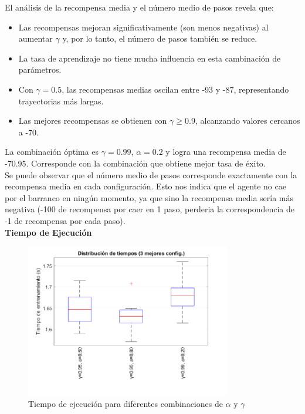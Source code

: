El análisis de la recompensa media y el número medio de pasos revela que:

\begin{itemize}
    \item Las recompensas mejoran significativamente (son menos negativas) al aumentar $\gamma$ y, por lo tanto, el número de pasos también se reduce. 
    \item La tasa de aprendizaje no tiene mucha influencia en esta cambinación de parámetros. 
    \item Con $\gamma = 0.5$, las recompensas medias oscilan entre -93 y -87, representando trayectorias más largas.
    \item Las mejores recompensas se obtienen con $\gamma \geq 0.9$, alcanzando valores cercanos a -70.
\end{itemize}

La combinación óptima es $\gamma = 0.99$, $\alpha = 0.2$ y logra una recompensa media de -70.95. Corresponde con la combinación que obtiene mejor tasa de éxito. 
\\

Se puede observar que el número medio de pasos corresponde exactamente con la recompensa media en cada configuración. Esto nos indica que el agente no cae por el barranco en ningún momento, ya que sino la recompensa media sería más negativa (-100 de recompensa por caer en 1 paso, perderia la correspondencia de -1 de recompensa por cada paso).
\\

\textbf{Tiempo de Ejecución}

\begin{figure}[H]
    \centering
    \includegraphics[width=0.8\textwidth]{../../experiments/qlearning/experiment-1/results/time.png}
    \caption{Tiempo de ejecución para diferentes combinaciones de $\alpha$ y $\gamma$}
    \label{fig:qlearning-time}
\end{figure}

